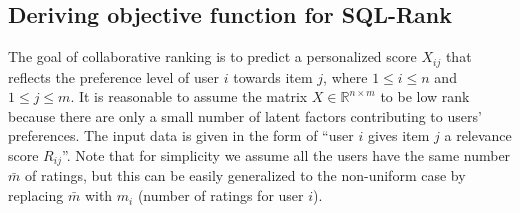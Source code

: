 \documentclass{article}
\def\R{\mathbb{R}}
\def\R{\mathbb{R}}
\begin{document}
\subsection{Deriving objective function for SQL-Rank}
The goal of collaborative ranking is to predict a personalized score $X_{ij}$ that reflects the preference level of user $i$ towards item $j$, where $1 \leq i \leq n$ and $1 \leq j \leq m$. It is reasonable to assume the matrix $X \in \R^{n \times m}$ to be low rank because there are only a small number of latent factors contributing to users' preferences. The input data is given in the form of ``user $i$ 
gives item $j$ a relevance score $R_{ij}$''. 
Note that for simplicity we assume all the users have the same number $\bar{m}$ of ratings, but this can be easily generalized
to the non-uniform case 
by replacing $\bar{m}$ with $m_i$ (number of ratings for user $i$). 


%

\end{document}

